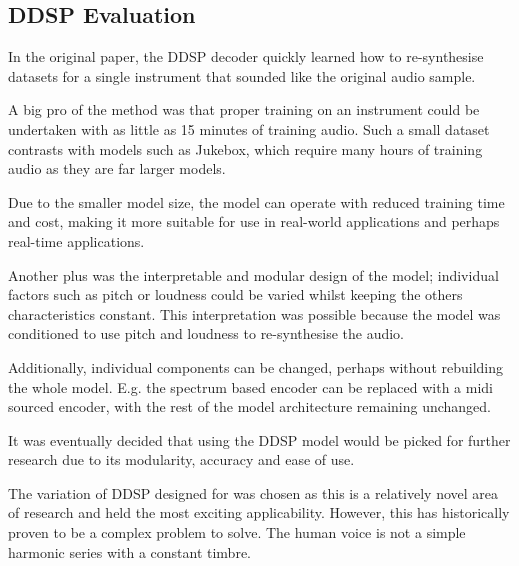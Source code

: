 \subsection{DDSP Evaluation}

In the original paper, the DDSP decoder quickly learned how to re-synthesise datasets for a single instrument that sounded like the original audio sample.

A big pro of the method was that proper training on an instrument could be undertaken with as little as 15 minutes of training audio. Such a small dataset contrasts with models such as Jukebox, which require many hours of training audio as they are far larger models.

Due to the smaller model size, the model can operate with reduced training time and cost, making it more suitable for use in real-world applications and perhaps real-time applications.

Another plus was the interpretable and modular design of the model; individual factors such as pitch or loudness could be varied whilst keeping the others characteristics constant. This interpretation was possible because the model was conditioned to use pitch and loudness to re-synthesise the audio.

Additionally, individual components can be changed, perhaps without rebuilding the whole model. E.g. the spectrum based encoder can be replaced with a midi sourced encoder, with the rest of the model architecture remaining unchanged.

It was eventually decided that using the DDSP model would be picked for further research due to its modularity, accuracy and ease of use.

The variation of DDSP designed for  was chosen as this is a relatively novel area of research and held the most exciting applicability. However, this has historically proven to be a complex problem to solve. The human voice is not a simple harmonic series with a constant timbre.